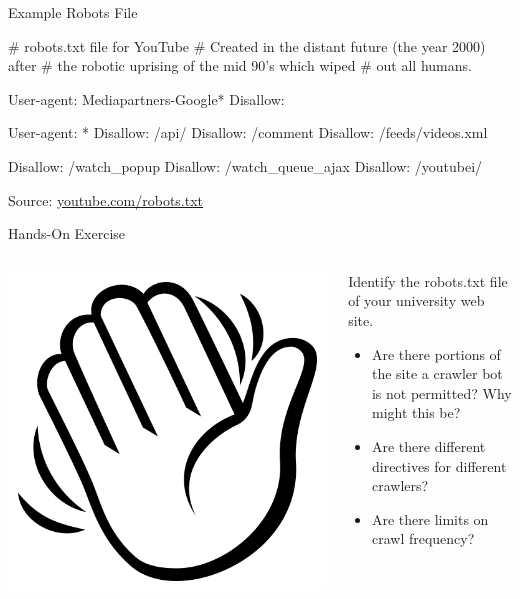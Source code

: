 \documentclass[ignorenonframetext,xcolor=x11names]{beamer}
\begin{document}
\begin{frame}[fragile]{Example Robots File}
\begin{textcode}
# robots.txt file for YouTube
# Created in the distant future (the year 2000) after
# the robotic uprising of the mid 90's which wiped 
# out all humans.

User-agent: Mediapartners-Google*
Disallow:

User-agent: *
Disallow: /api/
Disallow: /comment
Disallow: /feeds/videos.xml

Disallow: /watch_popup
Disallow: /watch_queue_ajax
Disallow: /youtubei/
\end{textcode}
\scriptsize Source: \url{youtube.com/robots.txt}
\end{frame}

\begin{frame}{Hands-On Exercise}
\begin{columns}
\begin{column}{0.2\textwidth}
\href{https://commons.wikimedia.org/wiki/File:Emojione_BW_1F44B.svg}{\includegraphics[width=\textwidth]{hand.png}}
\end{column}
\begin{column}{0.8\textwidth}
Identify the robots.txt file of your university web site.
\begin{itemize}
  \item Are there portions of the site a crawler bot is not permitted? Why might this be?
  \item Are there different directives for different crawlers?
  \item Are there limits on crawl frequency?
\end{itemize}
\end{column}
\end{columns}
\end{frame}
\end{document}
